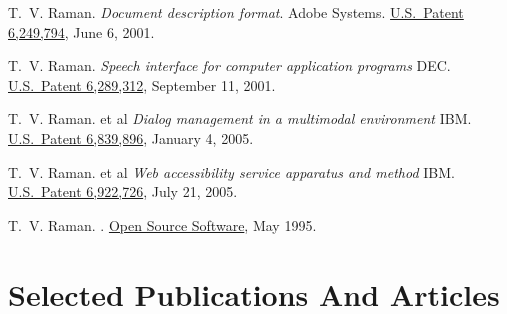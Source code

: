\documentclass{article}
\begin{document}
\begin{plainbibliography}{}
 T.~V. Raman.  \newblock \emph{Document
    description format}.  \newblock Adobe Systems.
\newblock \href{http://patft.uspto.gov/netacgi/nph-Parser?TERM1=6,249,794&Sect1=PTO1&Sect2=HITOFF&d=PALL&p=1&u=\%2Fnetahtml\%2Fsrchnum.htm&r=0&f=S&l=50}%
{U.S.\ Patent 6,249,794}, June 6, 2001.

 T.~V. Raman.  \newblock
  \emph{Speech interface for computer application programs}
  \newblock DEC.  \newblock
  \href{http://patft.uspto.gov/netacgi/nph-Parser?Sect1=PTO1&Sect2=HITOFF&d=PALL&p=1&u=/netahtml/srchnum.htm&r=1&f=G&l=50&s1='6289312'.WKU.&OS=PN/6289312&RS=PN/6289312}
  {U.S.\ Patent 6,289,312}, September 11, 2001.

 T.~V. Raman.  et al \newblock
  \emph{Dialog management  in a
multimodal environment}
  \newblock IBM.  \newblock
  \href{http://patft.uspto.gov/netacgi/nph-Parser?Sect1=PTO1\&Sect2=HITOFF\&d=PALL\&p=1\&u=/netahtml/srchnum.htm\&r=1\&f=G\&l=50\&s1=6839896.WKU.\&OS=PN/6839896\&RS=PN/6839896}
  {U.S.\ Patent 6,839,896}, January 4, 2005.

 T.~V. Raman.  et al \newblock
  \emph{Web accessibility service apparatus and method}
  \newblock IBM.  \newblock
  \href{http://patft.uspto.gov/netacgi/nph-Parser?Sect1=PTO1\&Sect2=HITOFF\&d=PALL\&p=1\&u=/netahtml/srchnum.htm\&r=1\&f=G\&l=50\&s1=6839896.WKU.\&OS=PN/6922726\&RS=PN/6839896}
  {U.S.\ Patent 6,922,726}, July 21, 2005.

 T.~V. Raman.  .
\newblock \href{http://emacspeak.sf.net}%
{Open Source Software}, May 1995.

\end{plainbibliography}

\section*{Selected Publications And Articles}
\end{document}
